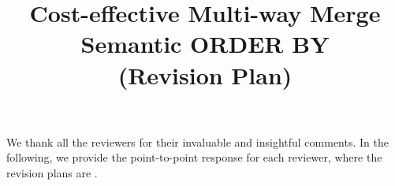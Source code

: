 \documentclass[sigconf]{acmart}
\begin{document}
\title{Cost-effective Multi-way Merge Semantic ORDER BY \\ (Revision Plan)}













\maketitle
We thank all the reviewers for their invaluable and insightful comments. In the following, we provide the point-to-point response for each reviewer, where the revision plans are .
\end{document}

